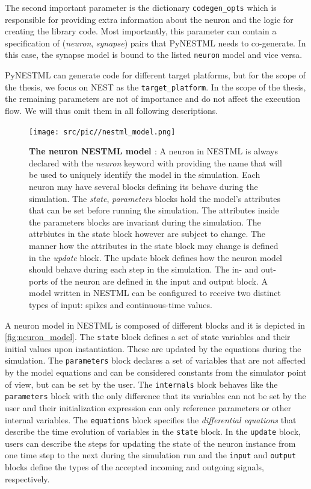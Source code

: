 The second important parameter is the dictionary \texttt{codegen\_opts} which is responsible for providing extra information about the neuron and the logic for creating the library code. Most importantly, this parameter can contain a specification of (\emph{neuron}, \emph{synapse}) pairs that PyNESTML needs to co-generate. In this case, the synapse model is bound to the listed \texttt{neuron} model and vice versa.

PyNESTML can generate code for different target platforms, but for the scope of the thesis, we focus on NEST as the \texttt{target\_platform}. In the scope of the thesis, the remaining parameters are not of importance and do not affect the execution flow. We will thus omit them in all following descriptions.

\begin{figure}[ht!]
    \centering
    \texttt{[image: src/pic//nestml\_model.png]}
    \caption{\textbf{The neuron NESTML model \cite[taken from][]{perun2018reengineering}}: A neuron in NESTML is always declared with the \emph{neuron} keyword with providing the name that will be used to uniquely identify the model in the simulation. Each neuron may have several blocks defining its behave during the simulation. The \emph{state}, \emph{parameters} blocks hold the model's attributes that can be set before running the simulation. The attributes inside the parameters blocks are invariant during the simulation. The attrbiutes in the state block however are subject to change. The manner how the attributes in the state block may change is defined in the \emph{update} block. The update block defines how the neuron model should behave during each step in the simulation. The in- and out-ports of the neuron are defined in the input and output block. A model written in NESTML can be configured to
    receive two distinct types of input: spikes and continuous-time values.} 
    \label{fig:neuron_model}
\end{figure}


A neuron model in NESTML is composed of different blocks and it is depicted in \autoref{fig:neuron_model}. The \texttt{state} block defines a set of state variables and their initial values upon instantiation. These are updated by the equations during the simulation. The \texttt{parameters} block declares a set of variables that are not affected by the model equations and can be considered constants from the simulator point of view, but can be set by the user. The \texttt{internals} block behaves like the \texttt{parameters} block with the only difference that its variables can not be set by the user and their initialization expression can only reference parameters or other internal variables. The \texttt{equations} block specifies the \emph{differential equations} that describe the time evolution of variables in the \texttt{state} block. In the \texttt{update} block, users can describe the steps for updating the state of the neuron instance from one time step to the next during the simulation run and the \texttt{input} and \texttt{output} blocks define the types of the accepted incoming and outgoing signals, respectively. \vspace{1em}



